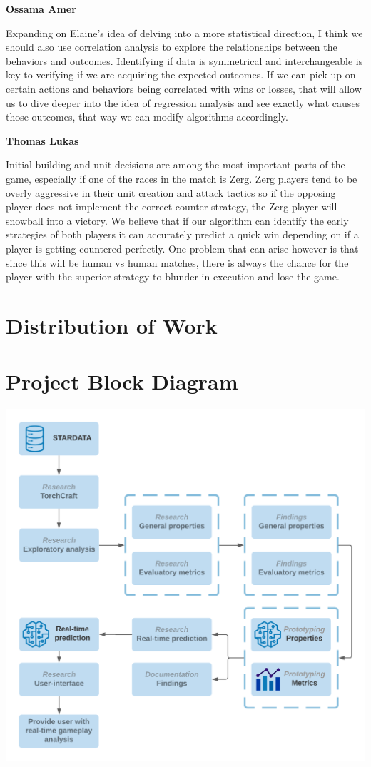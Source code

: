 \documentclass[a4paper,12pt]{report}
\newcommand{\msection}[1]{\noindent\textbf{#1}}
\begin{document}
\msection{Ossama Amer}

Expanding on Elaine’s idea of delving into a more statistical direction, I think we should also use correlation analysis to explore the relationships between the behaviors and outcomes. Identifying if data is symmetrical and interchangeable is key to verifying if we are acquiring the expected outcomes. If we can pick up on certain actions and behaviors being correlated with wins or losses, that will allow us to dive deeper into the idea of regression analysis and see exactly what causes those outcomes, that way we can modify algorithms accordingly.

\msection{Thomas Lukas}

Initial building and unit decisions are among the most important parts of the game, especially if one of the races in the match is Zerg. Zerg players tend to be overly aggressive in their unit creation and attack tactics so if the opposing player does not implement the correct counter strategy, the Zerg player will snowball into a victory. We believe that if our algorithm can identify the early strategies of both players it can accurately predict a quick win depending on if a player is getting countered perfectly. One problem that can arise however is that since this will be human vs human matches, there is always the chance for the player with the superior strategy to blunder in execution and lose the game.

\section{Distribution of Work}

\section{Project Block Diagram}
\begin{center}
    \captionsetup{type=figure}
    \includegraphics[width=.9\linewidth]{media/block_diagram.png}
\end{center}
\end{document}
